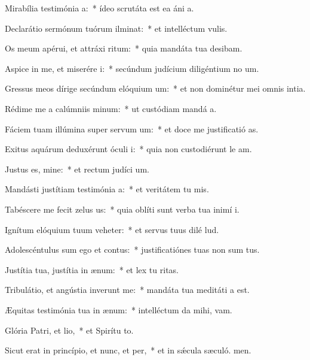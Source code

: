 \item Mirabília testimónia a:~* ídeo scrutáta est ea áni a.
\item Declarátio sermónum tuórum ilminat:~* et intelléctum  vulis.
\item Os meum apérui, et attráxi ritum:~* quia mandáta tua desibam.
\item Aspice in me, et miserére i:~* secúndum judícium diligéntium no um.
\item Gressus meos dírige secúndum elóquium um:~* et non dominétur mei omnis intia.
\item Rédime me a calúmniis minum:~* ut custódiam mandá a.
\item Fáciem tuam illúmina super servum um:~* et doce me justificatió as.
\item Exitus aquárum deduxérunt óculi i:~* quia non custodiérunt le am.
\item Justus es, mine:~* et rectum judíci um.
\item Mandásti justítiam testimónia a:~* et veritátem tu mis.
\item Tabéscere me fecit zelus us:~* quia oblíti sunt verba tua inimí i.
\item Ignítum elóquium tuum veheter:~* et servus tuus dilé lud.
\item Adolescéntulus sum ego et contus:~* justificatiónes tuas non sum tus.
\item Justítia tua, justítia in ænum:~* et lex tu ritas.
\item Tribulátio, et angústia inverunt me:~* mandáta tua meditáti a est.
\item Æquitas testimónia tua in ænum:~* intelléctum da mihi,  vam.
\item Glória Patri, et lio,~* et Spirítu to.
\item Sicut erat in princípio, et nunc, et per,~* et in sǽcula sæculó. men.

